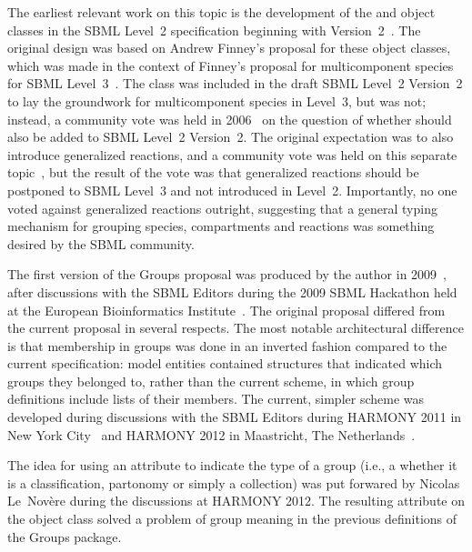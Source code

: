 The earliest relevant work on this topic is the development of the \CompartmentType and \SpeciesType object classes in the SBML Level~2 specification beginning with Version~2~\citep{l2v2}. The original design was based on Andrew Finney's proposal for these object classes, which was made in the context of Finney's proposal for multicomponent species for SBML Level~3~\citep{finney_2004}. The \SpeciesType class was included in the draft SBML Level~2 Version~2 to lay the groundwork for multicomponent species in Level~3, but  was not; instead, a community vote was held in 2006~\citep{vote_2006} on the question of whether  should also be added to SBML Level~2 Version~2. The original expectation was to also introduce generalized reactions, and a community vote was held on this separate topic~\citep{vote_2006b}, but the result of the vote was that generalized reactions should be postponed to SBML Level~3 and not introduced in Level~2. Importantly, no one voted against generalized reactions outright, suggesting that a general typing mechanism for grouping species, compartments and reactions was something desired by the SBML community.

The first version of the Groups proposal was produced by the author in 2009~\citep{hucka_2009}, after discussions with the SBML Editors during the 2009 SBML Hackathon held at the European Bioinformatics Institute~\citep{sbml_hackathon_2009}.  The original proposal differed from the current proposal in several respects. The most notable architectural difference is that membership in groups was done in an inverted fashion compared to the current specification: model entities contained structures that indicated which groups they belonged to, rather than the current scheme, in which group definitions include lists of their members.  The current, simpler scheme was developed during discussions with the SBML Editors during HARMONY 2011 in New York City~\citep{harmony_2011} and HARMONY 2012 in Maastricht, The Netherlands~\citep{harmony_2012}.

The idea for using an attribute to indicate the type of a group (i.e., a whether it is a classification, partonomy or simply a collection) was put forwared by Nicolas Le~Nov\`{e}re during the discussions at HARMONY 2012.  The resulting attribute  on the \Group object class solved a problem of group meaning in the previous definitions of the Groups package.

